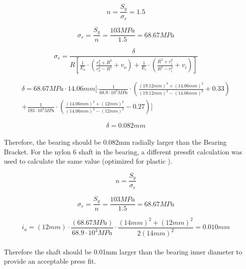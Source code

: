 \documentclass[../main.tex]{subfiles}
\begin{document}
\begin{equation}
n=\frac{S_y}{\sigma_r}=1.5
\end{equation}

\begin{equation}
{\sigma_r}=\frac{S_y}{n}=\frac{103MPa}{1.5}=68.67MPa
\end{equation}

\begin{equation}
\sigma_r=\frac{\delta}{R[\frac{1}{E_o}\cdot{}(\frac{r_o^2+R^2}{r_o^2-R^2}+v_o)+\frac{1}{E_i}\cdot{}(\frac{R^2+r_i^2}{R^2-r_i^2}+v_i)]}
\end{equation}	 
	
\begin{multline}
\delta = {68.67MPa}\cdot{}14.06mm[\cdot{}\frac{1}{68.9\cdot{10^3MPa}}\cdot{(\frac{(19.12mm)^2+(14.06mm)^2}{(19.12mm)^2-(14.06mm)^2}+0.33)}  
	\\ +\frac{1}{193\cdot{10^3MPa}}\cdot{(\frac{(14.06mm)^2+(12mm)^2}{(14.06mm)^2-(12mm)^2}-0.27)}]
\end{multline}

\begin{equation}
	\delta=0.082mm
\end{equation}
\\
Therefore, the bearing should be 0.082mm radially larger than the Bearing Bracket.
For the nylon 6 shaft in the bearing, a different pressfit calculation was used to calculate the same value (optimized for plastic \cite{pressfit}).

\begin{equation}
	n=\frac{S_y}{\sigma_r}
\end{equation}

\begin{equation}
{\sigma_r}=\frac{S_y}{n}=\frac{103MPa}{1.5}=68.67MPa
\end{equation}

\begin{equation}
i_a=(12mm)\cdot{}\frac{(68.67MPa)}{68.9\cdot{}10^3MPa}\cdot{}
\frac{(14mm)^2+(12mm)^2}{2(14mm)^2}=0.010mm
\end{equation}
\\
Therefore the shaft should be 0.01mm larger than the bearing inner diameter to provide an acceptable press fit.
\end{document}
